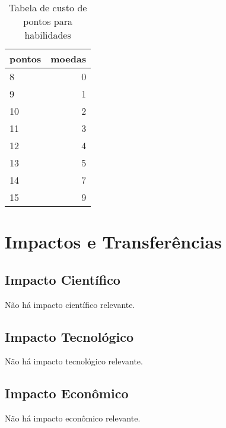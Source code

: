 \documentclass[a4paper,10pt]{article}  %
\begin{document}
\begin{table}
\begin{center}
 \caption{Tabela de custo de pontos para habilidades}
\begin{tabular}{|l|r|}
  \hline \hline
  pontos & moedas \\ \hline \hline
   8 & 0 \\ \hline
   9 & 1 \\ \hline
  10 & 2 \\ \hline
  11 & 3 \\ \hline
  12 & 4 \\ \hline
  13 & 5 \\ \hline
  14 & 7 \\ \hline
  15 & 9 \\ \hline \hline
\end{tabular} 
\label{tab:resultados}
\end{center}
\end{table}


\section{Impactos e Transferências}

\subsection{Impacto Científico}

Não há impacto científico relevante.

\subsection{Impacto Tecnológico}

Não há impacto tecnológico relevante.

\subsection{Impacto Econômico}

Não há impacto econômico relevante.

\end{document}
